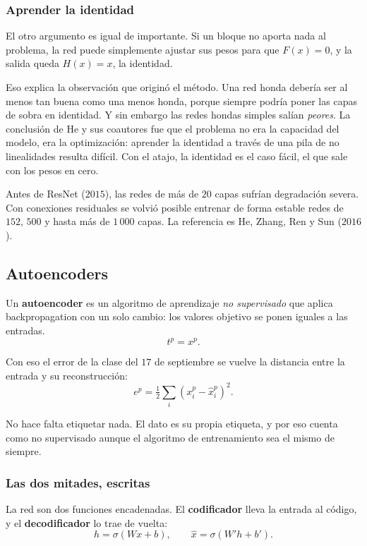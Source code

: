 \documentclass[11pt,letterpaper]{article}
\begin{document}
\subsubsection*{Aprender la identidad}

El otro argumento es igual de importante. Si un bloque no aporta nada
al problema, la red puede simplemente ajustar sus pesos para que
$F(x) = 0$, y la salida queda $H(x) = x$, la identidad.

\begin{idea}
  Eso explica la observación que originó el método. Una red honda
  debería ser al menos tan buena como una menos honda, porque siempre
  podría poner las capas de sobra en identidad. Y sin embargo las
  redes hondas simples salían \emph{peores}. La conclusión de He y sus
  coautores fue que el problema no era la capacidad del modelo, era la
  optimización: aprender la identidad a través de una pila de no
  linealidades resulta difícil. Con el atajo, la identidad es el caso
  fácil, el que sale con los pesos en cero.
\end{idea}

Antes de ResNet ($2015$), las redes de más de $20$ capas sufrían
degradación severa. Con conexiones residuales se volvió posible
entrenar de forma estable redes de $152$, $500$ y hasta más de $1\,000$
capas. La referencia es He, Zhang, Ren y Sun ($2016$).

\subsection*{Autoencoders}

Un \textbf{autoencoder} es un algoritmo de aprendizaje \emph{no
supervisado} que aplica backpropagation con un solo cambio: los
valores objetivo se ponen iguales a las entradas.
\[
    t^p = x^p .
\]

Con eso el error de la clase del $17$ de septiembre se vuelve la
distancia entre la entrada y su reconstrucción:
\[
    e^p = \tfrac{1}{2} \sum_i (x_i^p - \hat{x}_i^p)^2 .
\]

No hace falta etiquetar nada. El dato es su propia etiqueta, y por eso
cuenta como no supervisado aunque el algoritmo de entrenamiento sea el
mismo de siempre.

\subsubsection*{Las dos mitades, escritas}

La red son dos funciones encadenadas. El \textbf{codificador} lleva la
entrada al código, y el \textbf{decodificador} lo trae de vuelta:
\[
    h = \sigma(W x + b) ,
    \qquad
    \hat{x} = \sigma(W' h + b') .
\]
\end{document}
